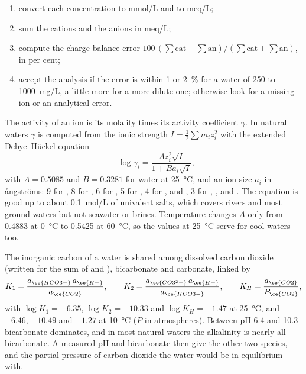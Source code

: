 \begin{method}\label{met:b3:water-rock-interaction:analysis}
\begin{enumerate}
\item convert each concentration to \unit{mmol/L} and to \unit{meq/L};
\item sum the cations and the anions in \unit{meq/L};
\item compute the charge-balance error $100\,(\sum\text{cat} -
  \sum\text{an})/(\sum\text{cat} + \sum\text{an})$, in per cent;
\item accept the analysis if the error is within 1 or \qty{2}{\percent} for a
  water of 250 to \qty{1000}{mg/L}, a little more for a more dilute one;
  otherwise look for a missing ion or an analytical error.
\end{enumerate}
\end{method}

The activity of an ion is its molality times its activity coefficient
$\gamma$. In natural waters $\gamma$ is computed from the ionic strength $I =
\tfrac12\sum m_i z_i^2$ with the extended Debye--Hückel equation
\[
-\log\gamma_i = \frac{A z_i^2\sqrt I}{1 + B a_i\sqrt I},
\]
with $A = 0.5085$ and $B = 0.3281$ for water at \qty{25}{\celsius}, and an
ion size $a_i$ in ångströms: 9 for , 8 for , 6 for
, 5 for , 4 for ,  and ,
3 for , ,  and . The equation is good up to
about \qty{0.1}{mol/L} of univalent salts, which covers rivers and most
ground waters but not seawater or brines. Temperature changes $A$ only from
0.4883 at \qty{0}{\celsius} to 0.5425 at \qty{60}{\celsius}, so the values at
\qty{25}{\celsius} serve for cool waters too.

The inorganic carbon of a water is shared among dissolved carbon dioxide
(written  for the sum of  and ), bicarbonate and
carbonate, linked by
\[
K_1 = \frac{a_{\ce{HCO3-}}\,a_{\ce{H+}}}{a_{\ce{CO2}}}, \qquad
K_2 = \frac{a_{\ce{CO3^2-}}\,a_{\ce{H+}}}{a_{\ce{HCO3-}}}, \qquad
K_H = \frac{a_{\ce{CO2}}}{P_{\ce{CO2}}},
\]
with $\log K_1 = -6.35$, $\log K_2 = -10.33$ and $\log K_H = -1.47$ at
\qty{25}{\celsius}, and $-6.46$, $-10.49$ and $-1.27$ at \qty{10}{\celsius}
($P$ in atmospheres). Between pH 6.4 and 10.3 bicarbonate dominates, and in
most natural waters the alkalinity is nearly all bicarbonate. A measured pH
and bicarbonate then give the other two species, and the partial pressure of
carbon dioxide the water would be in equilibrium with.

